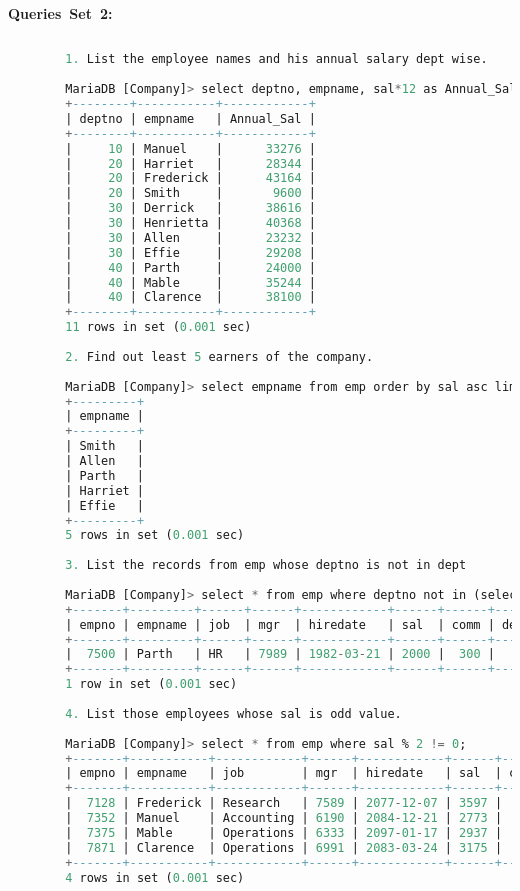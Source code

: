 \documentclass{article}
\begin{document}
	\textbf{Queries Set 2:} 
	\begin{lstlisting}[language=SQL] 
		
		1. List the employee names and his annual salary dept wise. 
		
		MariaDB [Company]> select deptno, empname, sal*12 as Annual_Sal from emp order by deptno; 
		+--------+-----------+------------+ 
		| deptno | empname   | Annual_Sal | 
		+--------+-----------+------------+ 
		|     10 | Manuel    |      33276 | 
		|     20 | Harriet   |      28344 | 
		|     20 | Frederick |      43164 | 
		|     20 | Smith     |       9600 | 
		|     30 | Derrick   |      38616 | 
		|     30 | Henrietta |      40368 | 
		|     30 | Allen     |      23232 | 
		|     30 | Effie     |      29208 | 
		|     40 | Parth     |      24000 | 
		|     40 | Mable     |      35244 | 
		|     40 | Clarence  |      38100 | 
		+--------+-----------+------------+ 
		11 rows in set (0.001 sec) 
		
		2. Find out least 5 earners of the company. 
		
		MariaDB [Company]> select empname from emp order by sal asc limit 5; 
		+---------+ 
		| empname | 
		+---------+ 
		| Smith   | 
		| Allen   | 
		| Parth   | 
		| Harriet | 
		| Effie   | 
		+---------+ 
		5 rows in set (0.001 sec) 
		
		3. List the records from emp whose deptno is not in dept 
		
		MariaDB [Company]> select * from emp where deptno not in (select deptno from dept); 
		+-------+---------+------+------+------------+------+------+--------+ 
		| empno | empname | job  | mgr  | hiredate   | sal  | comm | deptno | 
		+-------+---------+------+------+------------+------+------+--------+ 
		|  7500 | Parth   | HR   | 7989 | 1982-03-21 | 2000 |  300 |     60 | 
		+-------+---------+------+------+------------+------+------+--------+ 
		1 row in set (0.001 sec) 
		
		4. List those employees whose sal is odd value. 
		
		MariaDB [Company]> select * from emp where sal % 2 != 0; 
		+-------+-----------+------------+------+------------+------+------+--------+ 
		| empno | empname   | job        | mgr  | hiredate   | sal  | comm | deptno | 
		+-------+-----------+------------+------+------------+------+------+--------+ 
		|  7128 | Frederick | Research   | 7589 | 2077-12-07 | 3597 |  203 |     20 | 
		|  7352 | Manuel    | Accounting | 6190 | 2084-12-21 | 2773 |  253 |     10 | 
		|  7375 | Mable     | Operations | 6333 | 2097-01-17 | 2937 |  210 |     40 | 
		|  7871 | Clarence  | Operations | 6991 | 2083-03-24 | 3175 |  228 |     40 | 
		+-------+-----------+------------+------+------------+------+------+--------+ 
		4 rows in set (0.001 sec) 
		

\end{lstlisting}
\end{document}
